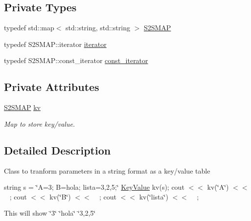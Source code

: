 \subsection*{Private Types}
\begin{DoxyCompactItemize}
\item 
typedef std\+::map$<$ std\+::string, std\+::string $>$ \hyperlink{classupc_1_1KeyValue_a7f07bc656bce50d056f5ad0d118b2562}{S2\+S\+M\+AP}
\item 
typedef S2\+S\+M\+A\+P\+::iterator \hyperlink{classupc_1_1KeyValue_a3c6dedd86b7be8eadf7334b08d97364c}{iterator}
\item 
typedef S2\+S\+M\+A\+P\+::const\+\_\+iterator \hyperlink{classupc_1_1KeyValue_a1979eeaeda79e31e99fc6dc75b971373}{const\+\_\+iterator}
\end{DoxyCompactItemize}
\subsection*{Private Attributes}
\begin{DoxyCompactItemize}
\item 
\hyperlink{classupc_1_1KeyValue_a7f07bc656bce50d056f5ad0d118b2562}{S2\+S\+M\+AP} \hyperlink{classupc_1_1KeyValue_a5a75d6c2fb82f07ba0798cfeceefff01}{kv}
\begin{DoxyCompactList}\small\item\em Map to store key/value. \end{DoxyCompactList}\end{DoxyCompactItemize}


\subsection{Detailed Description}
Class to tranform parameters in a string format as a key/value table

string s = \char`\"{}\+A=3; B=hola; lista=3,2,5;\char`\"{} \hyperlink{classupc_1_1KeyValue}{Key\+Value} kv(s); cout $<$$<$ kv(\char`\"{}\+A\char`\"{}) $<$$<$ \textquotesingle{}~\newline
\textquotesingle{}; cout $<$$<$ kv(\char`\"{}\+B\char`\"{}) $<$$<$ \textquotesingle{}~\newline
\textquotesingle{}; cout $<$$<$ kv(\char`\"{}lista\char`\"{}) $<$$<$ \textquotesingle{}~\newline
\textquotesingle{};

This will show \char`\"{}3\char`\"{} \char`\"{}hola\char`\"{} \char`\"{}3,2,5\char`\"{}

